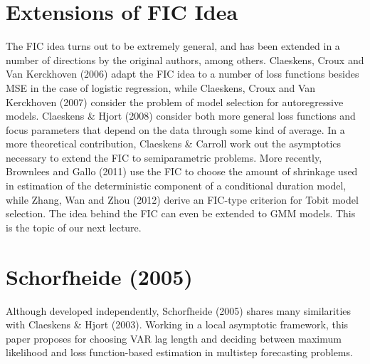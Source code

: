 \documentclass[12pt]{article}
\theoremstyle{definition}
\begin{document}
\section{Extensions of FIC Idea}
The FIC idea turns out to be extremely general, and has been extended in a number of directions by the original authors, among others. 
Claeskens, Croux and Van Kerckhoven (2006) adapt the FIC idea to a number of loss functions besides MSE in the case of logistic regression, while Claeskens, Croux and Van Kerckhoven (2007) consider the problem of model selection for autoregressive models. 
Claeskens \& Hjort (2008) consider both more general loss functions and focus parameters that depend on the data through some kind of average. In a more theoretical contribution, Claeskens \& Carroll work out the asymptotics necessary to extend the FIC to semiparametric problems.
 More recently, Brownlees and Gallo (2011) use the FIC to choose the amount of shrinkage used in estimation of the deterministic component of a conditional duration model, while Zhang, Wan and Zhou (2012) derive an FIC-type criterion for Tobit model selection. 
 The idea behind the FIC can even be extended to GMM models. This is the topic of our next lecture.

\section{Schorfheide (2005)}
Although developed independently, Schorfheide (2005) shares many similarities with Claeskens \& Hjort (2003). 
Working in a local asymptotic framework, this paper proposes for choosing VAR lag length and deciding between maximum likelihood and loss function-based estimation in multistep forecasting problems.
\end{document}
